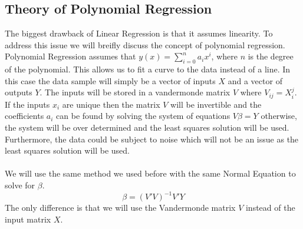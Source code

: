 \subsection{Theory of Polynomial Regression}
The biggest drawback of Linear Regression is that it assumes linearity. To address this issue we will breifly discuss the concept of polynomial regression.
Polynomial Regression assumes that $y(x)=\sum_{i=0}^{n}a_{i}x^{i}$, where $n$ is the degree of the polynomial. This allows us to fit a curve to the data instead of a line$.$
In this case the data sample will simply be a vector of inputs $X$ and a vector of outputs $Y$. 
The inputs will be stored in a vandermonde matrix $V$ where $V_{ij}=X_{i}^{j}$. 
If the inputs $x_{i}$ are unique then the matrix $V$ will be invertible and the coefficients $a_{i}$ can be found by solving the system of equations $V\beta=Y$
otherwise, the system will be over determined and the least squares solution will be used. Furthermore, the data could be subject to noise which will not be an issue as the least squares solution will be used.
\\\\
We will use the same method we used before with the same Normal Equation to solve for $\beta$.
\begin{equation}
    \beta={(V'V)}^{-1}V'Y
\end{equation}
The only difference is that we will use the Vandermonde matrix $V$ instead of the input matrix $X$.

